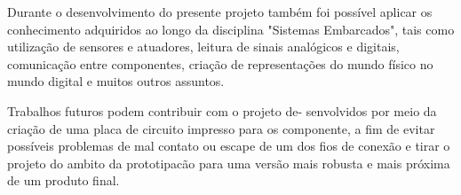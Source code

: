 \documentclass[conference]{IEEEtran}
\begin{document}
Durante o desenvolvimento do presente projeto também foi possível aplicar os conhecimento adquiridos ao longo da disciplina "Sistemas Embarcados", tais como utilização de sensores e atuadores, leitura de sinais analógicos e digitais, comunicação entre componentes, criação de representações do mundo físico no mundo digital e muitos outros assuntos.

Trabalhos futuros podem contribuir com o projeto de-
senvolvidos por meio da criação de uma placa de circuito impresso para os componente, a fim de evitar possíveis problemas de mal contato ou escape de um dos fios de conexão e tirar o projeto do ambito da prototipacão para uma versão mais robusta e mais próxima de um produto final.
\section*{}




\end{document}
